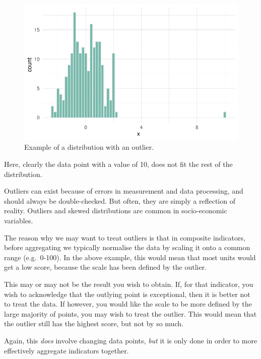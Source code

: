 \documentclass[
  letterpaper,
  DIV=11,
  numbers=noendperiod]{scrreprt}
\begin{document}
\begin{figure}

{\centering \includegraphics{outliers_files/figure-pdf/unnamed-chunk-1-1.pdf}

}

\caption{Example of a distribution with an outlier.}

\end{figure}

Here, clearly the data point with a value of 10, does not fit the rest
of the distribution.

Outliers can exist because of errors in measurement and data processing,
and should always be double-checked. But often, they are simply a
reflection of reality. Outliers and skewed distributions are common in
socio-economic variables.

The reason why we may want to treat outliers is that in composite
indicators, before aggregating we typically normalise the data by
scaling it onto a common range (e.g.~0-100). In the above example, this
would mean that most units would get a low score, because the scale has
been defined by the outlier.

This may or may not be the result you wish to obtain. If, for that
indicator, you wish to acknowledge that the outlying point is
exceptional, then it is better not to treat the data. If however, you
would like the scale to be more defined by the large majority of points,
you may wish to treat the outlier. This would mean that the outlier
still has the highest score, but not by so much.

Again, this \emph{does} involve changing data points, \emph{but} it is
only done in order to more effectively aggregate indicators together.
\end{document}
